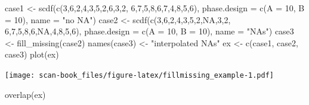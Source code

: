 \documentclass[
]{book}
\newenvironment{Shaded}{\begin{snugshade}}{\end{snugshade}}
\newcommand{\AttributeTok}[1]{\textcolor[rgb]{0.77,0.63,0.00}{#1}}
\newcommand{\ConstantTok}[1]{\textcolor[rgb]{0.00,0.00,0.00}{#1}}
\newcommand{\DecValTok}[1]{\textcolor[rgb]{0.00,0.00,0.81}{#1}}
\newcommand{\FunctionTok}[1]{\textcolor[rgb]{0.00,0.00,0.00}{#1}}
\newcommand{\NormalTok}[1]{#1}
\newcommand{\OtherTok}[1]{\textcolor[rgb]{0.56,0.35,0.01}{#1}}
\newcommand{\StringTok}[1]{\textcolor[rgb]{0.31,0.60,0.02}{#1}}
\begin{document}
\begin{Shaded}
\begin{Highlighting}[]
\NormalTok{case1 }\OtherTok{\textless{}{-}} \FunctionTok{scdf}\NormalTok{(}\FunctionTok{c}\NormalTok{(}\DecValTok{3}\NormalTok{,}\DecValTok{6}\NormalTok{,}\DecValTok{2}\NormalTok{,}\DecValTok{4}\NormalTok{,}\DecValTok{3}\NormalTok{,}\DecValTok{5}\NormalTok{,}\DecValTok{2}\NormalTok{,}\DecValTok{6}\NormalTok{,}\DecValTok{3}\NormalTok{,}\DecValTok{2}\NormalTok{, }\DecValTok{6}\NormalTok{,}\DecValTok{7}\NormalTok{,}\DecValTok{5}\NormalTok{,}\DecValTok{8}\NormalTok{,}\DecValTok{6}\NormalTok{,}\DecValTok{7}\NormalTok{,}\DecValTok{4}\NormalTok{,}\DecValTok{8}\NormalTok{,}\DecValTok{5}\NormalTok{,}\DecValTok{6}\NormalTok{), }
              \AttributeTok{phase.design =} \FunctionTok{c}\NormalTok{(}\AttributeTok{A =} \DecValTok{10}\NormalTok{, }\AttributeTok{B =} \DecValTok{10}\NormalTok{), }\AttributeTok{name =} \StringTok{"no NA"}\NormalTok{)}
\NormalTok{case2 }\OtherTok{\textless{}{-}} \FunctionTok{scdf}\NormalTok{(}\FunctionTok{c}\NormalTok{(}\DecValTok{3}\NormalTok{,}\DecValTok{6}\NormalTok{,}\DecValTok{2}\NormalTok{,}\DecValTok{4}\NormalTok{,}\DecValTok{3}\NormalTok{,}\DecValTok{5}\NormalTok{,}\DecValTok{2}\NormalTok{,}\ConstantTok{NA}\NormalTok{,}\DecValTok{3}\NormalTok{,}\DecValTok{2}\NormalTok{, }\DecValTok{6}\NormalTok{,}\DecValTok{7}\NormalTok{,}\DecValTok{5}\NormalTok{,}\DecValTok{8}\NormalTok{,}\DecValTok{6}\NormalTok{,}\ConstantTok{NA}\NormalTok{,}\DecValTok{4}\NormalTok{,}\DecValTok{8}\NormalTok{,}\DecValTok{5}\NormalTok{,}\DecValTok{6}\NormalTok{), }
              \AttributeTok{phase.design =} \FunctionTok{c}\NormalTok{(}\AttributeTok{A =} \DecValTok{10}\NormalTok{, }\AttributeTok{B =} \DecValTok{10}\NormalTok{), }\AttributeTok{name =} \StringTok{"NAs"}\NormalTok{)}
\NormalTok{case3 }\OtherTok{\textless{}{-}} \FunctionTok{fill\_missing}\NormalTok{(case2)}
\FunctionTok{names}\NormalTok{(case3) }\OtherTok{\textless{}{-}} \StringTok{"interpolated NAs"}
\NormalTok{ex }\OtherTok{\textless{}{-}} \FunctionTok{c}\NormalTok{(case1, case2, case3)}
\FunctionTok{plot}\NormalTok{(ex)}
\end{Highlighting}
\end{Shaded}

\texttt{[image: scan-book\_files/figure-latex/fillmissing\_example-1.pdf]}

\begin{Shaded}
\begin{Highlighting}[]
\FunctionTok{overlap}\NormalTok{(ex)}
\end{Highlighting}
\end{Shaded}
\end{document}
